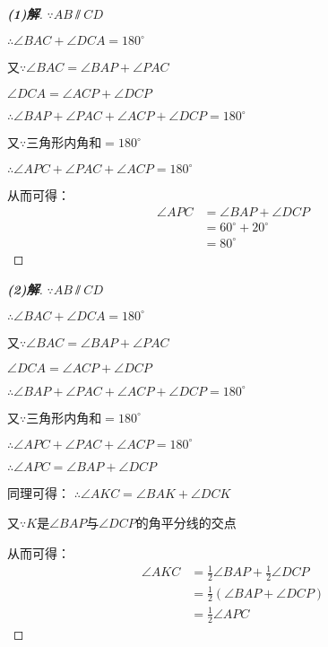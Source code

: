 \documentclass[fleqn]{ctexart}
\begin{document}
\begin{proof}[\textbf{(1)解}]
  $\because AB \varparallel CD$

  $\therefore \angle BAC + \angle DCA = 180^\circ$

  又$\because \angle BAC = \angle BAP + \angle PAC$
  
  $\angle DCA = \angle ACP + \angle DCP$

  $\therefore \angle BAP + \angle PAC + \angle ACP + \angle DCP = 180^\circ$

  又$\because$三角形内角和$=180^\circ$
  
  $\therefore \angle APC + \angle PAC + \angle ACP = 180^\circ$

  从而可得：
  \begin{align*}
    \angle APC & = \angle BAP + \angle DCP \\
               & = 60^\circ + 20^\circ\\
               & = 80^\circ                 
  \end{align*}  
\end{proof}

\begin{proof}[\textbf{(2)解}]
  $\because AB \varparallel CD$

  $\therefore \angle BAC + \angle DCA = 180^\circ$

  又$\because \angle BAC = \angle BAP + \angle PAC$
  
  $\angle DCA = \angle ACP + \angle DCP$

  $\therefore \angle BAP + \angle PAC + \angle ACP + \angle DCP = 180^\circ$

  又$\because$三角形内角和$=180^\circ$
  
  $\therefore \angle APC + \angle PAC + \angle ACP = 180^\circ$

  $\therefore \angle APC = \angle BAP + \angle DCP$

  同理可得：
  $\therefore \angle AKC = \angle BAK + \angle DCK$
  
  又$\because K$是$\angle BAP$与$\angle DCP$的角平分线的交点

  从而可得：
  \begin{align*}
    \angle AKC & = \frac{1}{2}\angle BAP + \frac{1}{2}\angle DCP \\
               & = \frac{1}{2}\left(\angle BAP + \angle DCP\right) \\
               & = \frac{1}{2}\angle APC                 
  \end{align*}  
\end{proof}
\end{document}
